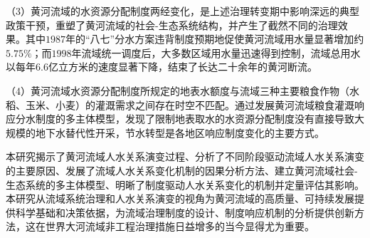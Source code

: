 \begin{cabstract}
（3）黄河流域的水资源分配制度两经变化，是上述治理转变期中影响深远的典型政策干预，重塑了黄河流域的社会-生态系统结构，并产生了截然不同的治理效果。其中$1987$年的“八七”分水方案违背制度预期地促使黄河流域用水量显著增加约$5.75\%$；而$1998$年流域统一调度后，大多数区域用水量迅速得到控制，流域总用水以每年$6.6$亿立方米的速度显著下降，结束了长达二十余年的黄河断流。

（4）黄河流域水资源分配制度所规定的地表水额度与流域三种主要粮食作物（水稻、玉米、小麦）的灌溉需求之间存在时空不匹配。通过发展黄河流域粮食灌溉响应分水制度的多主体模型，发现了限制地表取水的水资源分配制度没有直接导致大规模的地下水替代性开采，节水转型是各地区响应制度变化的主要方式。


本研究揭示了黄河流域人水关系演变过程、分析了不同阶段驱动流域人水关系演变的主要原因、发展了流域人水关系变化机制的因果分析方法、建立黄河流域社会-生态系统的多主体模型、明晰了制度驱动人水关系变化的机制并定量评估其影响。本研究从流域系统治理和人水关系演变的视角为黄河流域的高质量、可持续发展提供科学基础和决策依据，为流域治理制度的设计、制度响应机制的分析提供创新方法，这在世界大河流域非工程治理措施日益增多的当今显得尤为重要。


\end{cabstract}



